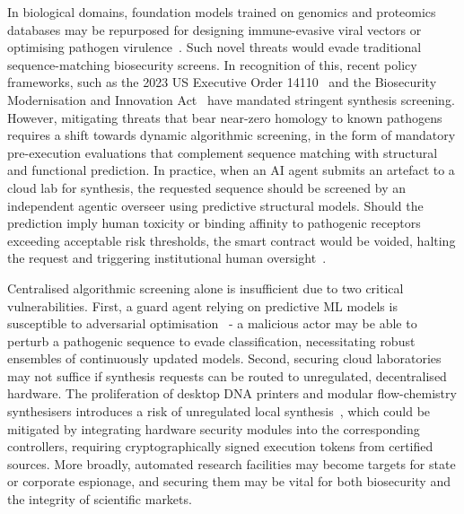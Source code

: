 \documentclass[11pt, a4paper, twocolumn, goog]{google}
\begin{document}
In biological domains, foundation models trained on genomics and proteomics databases may be repurposed for designing immune-evasive viral vectors or optimising pathogen virulence~\citep{carter2023convergence, pannu2025dual, callaway2026ai}. Such novel threats would evade traditional sequence-matching biosecurity screens. In recognition of this, recent policy frameworks, such as the 2023 US Executive Order 14110~\citep{biden2023executive} and the Biosecurity Modernisation and Innovation Act~\citep{s3741_2026} have mandated stringent synthesis screening. However, mitigating threats that bear near-zero homology to known pathogens requires a shift towards dynamic algorithmic screening, in the form of mandatory pre-execution evaluations that complement sequence matching with structural and functional prediction. In practice, when an AI agent submits an artefact to a cloud lab for synthesis, the requested sequence should be screened by an independent agentic overseer using predictive structural models. Should the prediction imply human toxicity or binding affinity to pathogenic receptors exceeding acceptable risk thresholds, the smart contract would be voided, halting the request and triggering institutional human oversight~\citep{berezin2024cryptographic, tayouri2025defending, baum2026system, edison2026assembling}.

Centralised algorithmic screening alone is insufficient due to two critical vulnerabilities. First, a guard agent relying on predictive ML models is susceptible to adversarial optimisation~\citep{goodfellow2014explaining, leung2015machine, meiseles2020adversarial} - a malicious actor may be able to perturb a pathogenic sequence to evade classification, necessitating robust ensembles of continuously updated models. Second, securing cloud laboratories may not suffice if synthesis requests can be routed to unregulated, decentralised hardware. The proliferation of desktop DNA printers and modular flow-chemistry synthesisers introduces a risk of unregulated local synthesis~\citep{adam2024substitution, ma2024automated, liu2025research}, which could be mitigated by integrating hardware security modules into the corresponding controllers, requiring cryptographically signed execution tokens from certified sources. More broadly, automated research facilities may become targets for state or corporate espionage, and securing them may be vital for both biosecurity and the integrity of scientific markets.
\end{document}
